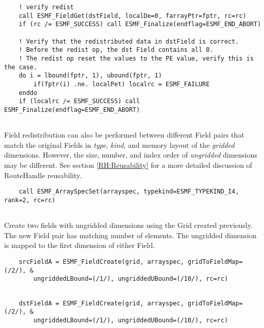 \begin{verbatim}
    ! verify redist
    call ESMF_FieldGet(dstField, localDe=0, farrayPtr=fptr, rc=rc)
    if (rc /= ESMF_SUCCESS) call ESMF_Finalize(endflag=ESMF_END_ABORT)

    ! Verify that the redistributed data in dstField is correct.
    ! Before the redist op, the dst Field contains all 0. 
    ! The redist op reset the values to the PE value, verify this is the case.
    do i = lbound(fptr, 1), ubound(fptr, 1)
        if(fptr(i) .ne. localPet) localrc = ESMF_FAILURE
    enddo
    if (localrc /= ESMF_SUCCESS) call ESMF_Finalize(endflag=ESMF_END_ABORT)
 
\end{verbatim}
 

   Field redistribution can also be performed between different Field pairs that
   match the original Fields in {\em type}, {\em kind}, and memory layout of the
   {\em gridded} dimensions. However, the size, number, and index order of 
   {\em ungridded} dimensions may be different. See section \ref{RH:Reusability}
   for a more detailed discussion of RouteHandle reusability. 

 \begin{verbatim}
    call ESMF_ArraySpecSet(arrayspec, typekind=ESMF_TYPEKIND_I4, rank=2, rc=rc)
 
\end{verbatim}
 

   Create two fields with ungridded dimensions using the Grid created previously.
   The new Field pair has matching number of elements. The ungridded dimension
   is mapped to the first dimension of either Field. 

 \begin{verbatim}
    srcFieldA = ESMF_FieldCreate(grid, arrayspec, gridToFieldMap=(/2/), &
        ungriddedLBound=(/1/), ungriddedUBound=(/10/), rc=rc)
 
\end{verbatim}
 

 \begin{verbatim}
    dstFieldA = ESMF_FieldCreate(grid, arrayspec, gridToFieldMap=(/2/), &
        ungriddedLBound=(/1/), ungriddedUBound=(/10/), rc=rc)
 
\end{verbatim}
 
